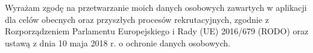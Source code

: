 \documentclass[a4paper,11pt]{article}
\begin{document}
\vspace*{\fill}


{\centering\fontsize{6pt}{10pt}\selectfont Wyrażam zgodę na przetwarzanie moich danych osobowych zawartych w aplikacji dla celów obecnych oraz przyszłych procesów rekrutacyjnych, zgodnie z Rozporządzeniem Parlamentu Europejskiego i Rady (UE) 2016/679 (RODO) oraz ustawą z dnia 10 maja 2018 r. o ochronie danych osobowych. \par}
\end{document}
